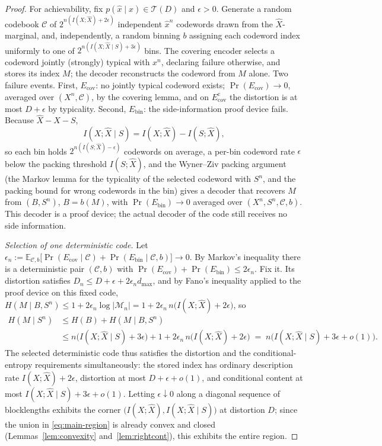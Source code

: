 \documentclass[11pt,onecolumn]{IEEEtran}
\newcommand{\E}{\mathbb{E}}
\newcommand{\hX}{\widehat{X}}
\begin{document}
\begin{proof}
For achievability, fix $p(\hat x\mid x)\in\mathcal T(D)$ and $\epsilon>0$.
Generate a random codebook $\mathcal C$ of $2^{n(I(X;\hX)+2\epsilon)}$
independent $\hat x^n$ codewords drawn from the $\hX$-marginal, and,
independently, a random binning $b$ assigning each codeword index
uniformly to one of $2^{n(I(X;\hX\mid S)+3\epsilon)}$ bins. The covering
encoder selects a codeword jointly (strongly) typical with $x^n$,
declaring failure otherwise, and stores its index $M$; the decoder
reconstructs the codeword from $M$ alone. Two failure events. First,
$E_{\mathrm{cov}}$: no jointly typical codeword exists;
$\Pr(E_{\mathrm{cov}})\to0$, averaged over $(X^n,\mathcal C)$, by the
covering lemma, and on $E_{\mathrm{cov}}^{\mathrm c}$ the distortion is
at most $D+\epsilon$ by typicality. Second, $E_{\mathrm{bin}}$: the
side-information proof device fails. Because $\hX-X-S$,
\begin{equation}
 I(X;\hX\mid S)=I(X;\hX)-I(S;\hX),
\end{equation}
so each bin holds $2^{n(I(S;\hX)-\epsilon)}$ codewords on average, a
per-bin codeword rate $\epsilon$ below the packing threshold $I(S;\hX)$,
and the Wyner--Ziv packing argument \cite{wynerziv1976} (the Markov lemma for
the typicality of the selected codeword with $S^n$, and the packing
bound for wrong codewords in the bin) gives a decoder that recovers $M$
from $(B,S^n)$, $B=b(M)$, with
$\Pr(E_{\mathrm{bin}})\to0$ averaged over $(X^n,S^n,\mathcal C,b)$.
This decoder is a proof device; the actual decoder of the code still
receives no side information.

\emph{Selection of one deterministic code.} Let
$\epsilon_n:=\E_{\mathcal C,b}\bigl[\Pr(E_{\mathrm{cov}}\mid\mathcal C)
+\Pr(E_{\mathrm{bin}}\mid\mathcal C,b)\bigr]\to0$. By Markov's
inequality there is a deterministic pair $(\mathcal C,b)$ with
$\Pr(E_{\mathrm{cov}})+\Pr(E_{\mathrm{bin}})\le2\epsilon_n$. Fix it.
Its distortion satisfies
$D_n\le D+\epsilon+2\epsilon_n d_{\max}$, and by Fano's inequality
applied to the proof device on this fixed code,
$H(M\mid B,S^n)\le1+2\epsilon_n\log|\mathcal M_n|
=1+2\epsilon_n\,n\bigl(I(X;\hX)+2\epsilon\bigr)$, so
\begin{align}
 H(M\mid S^n)
 &\le H(B)+H(M\mid B,S^n)\nonumber\\
 &\le n\bigl(I(X;\hX\mid S)+3\epsilon\bigr)
 +1+2\epsilon_n\,n\bigl(I(X;\hX)+2\epsilon\bigr)
 \;=\;n\bigl(I(X;\hX\mid S)+3\epsilon+o(1)\bigr).
 \label{eq:entropy-ach}
\end{align}
The selected deterministic code thus satisfies the distortion and the
conditional-entropy requirements simultaneously: the stored index has
ordinary description rate $I(X;\hX)+2\epsilon$, distortion at most
$D+\epsilon+o(1)$, and conditional content at most
$I(X;\hX\mid S)+3\epsilon+o(1)$. Letting $\epsilon\downarrow0$ along a
diagonal sequence of blocklengths exhibits the corner
$\bigl(I(X;\hX),I(X;\hX\mid S)\bigr)$ at distortion $D$; since the
union in \eqref{eq:main-region} is already convex and closed
(Lemmas~\ref{lem:convexity} and~\ref{lem:rightcont}), this exhibits
the entire region.
\end{proof}
\end{document}
